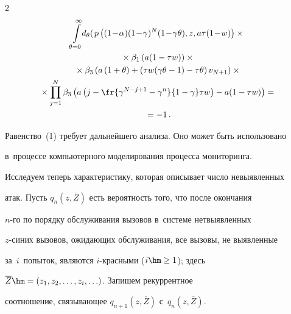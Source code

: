 \begin{multicols}{2}
\begin{multline}
 \int\limits^\infty_{\theta=0}\hspace*{-1mm}


   d_\theta \!\left(\! \right.


  p\left( (1\!-\!\alpha) (1\!-\!\gamma)^N (1\!-\!\gamma\theta), z, 


  a\tau(1\!-\!w)\right)\times{}\\


{}\times


\beta_1\left(a(1-\tau w)\right)\times{}\\


{}\times \beta_3\left( a\left(1+\theta\right)+\left(\tau 


w(\gamma\theta-1)-\tau\theta\right) v_{N+1}\right) \times{}\\


{}\times


  \prod^N_{j=1}\beta_3 \left(a\left( 


  j-\fr{\gamma^{N-j+1}-\gamma^n}{1-\gamma}\tau w\right)-a(1-\tau w)\right)={}\\


  {}=-1\,.


  \label{e1-sim}


  \end{multline}


  


  Равенство~(1) требует дальнейшего анализа. Оно может быть использовано 


в~процессе компьютерного моделирования процесса мониторинга.


  


  Исследуем теперь характеристику, которая описывает число невыявленных 


атак. Пусть $q_n(z,\overline{Z})$ есть вероятность того, что после окончания 


\mbox{$n$-го} по порядку обслуживания вызовов в~системе нет\linebreak выявленных  


$z$-си\-них вызовов, ожидающих обслуживания, все вызовы, не выявленные 


за~$i$~попыток, являются $i$-крас\-ны\-ми ($i\hm\geq 1$); здесь 


$\overline{Z}\hm= (z_1, z_2, \ldots , z_i, \ldots)$. Запишем рекуррентное 


\mbox{соотношение}, связывающее $q_{n+1}(z,\overline{Z})$ с~$q_n(z,\overline{Z})$.



\end{multicols}
